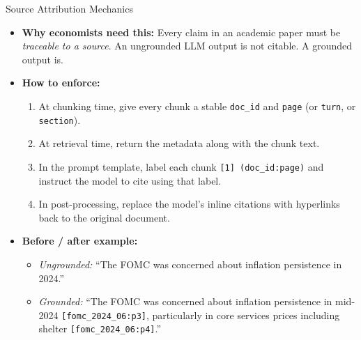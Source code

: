 \documentclass[10pt,english,aspectratio=169]{beamer}
\begin{document}
\begin{frame}{Source Attribution Mechanics}
\begin{itemize}
\item \textbf{Why economists need this:} Every claim in an academic paper must be \emph{traceable to a source}. An ungrounded LLM output is not citable. A grounded output is.

\medskip
\item \textbf{How to enforce:}
\begin{enumerate}
    \item At chunking time, give every chunk a stable \texttt{doc\_id} and \texttt{page} (or \texttt{turn}, or \texttt{section}).
    \item At retrieval time, return the metadata along with the chunk text.
    \item In the prompt template, label each chunk \texttt{[1] (doc\_id:page)} and instruct the model to cite using that label.
    \item In post-processing, replace the model's inline citations with hyperlinks back to the original document.
\end{enumerate}

\medskip
\item \textbf{Before / after example:}
\begin{itemize}
    \item \emph{Ungrounded:} ``The FOMC was concerned about inflation persistence in 2024.''
    \item \emph{Grounded:} ``The FOMC was concerned about inflation persistence in mid-2024 \texttt{[fomc\_2024\_06:p3]}, particularly in core services prices including shelter \texttt{[fomc\_2024\_06:p4]}.''
\end{itemize}
\end{itemize}
\end{frame}
\end{document}
